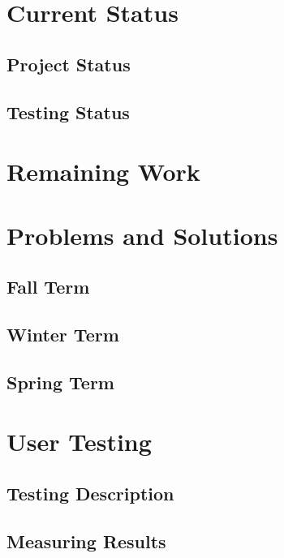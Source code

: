 \documentclass[letterpaper,10pt,titlepage,draftclsnofoot,onecolumn,onesided] {IEEEtran}
\begin{document}
\section{Current Status}
	\subsection{Project Status}
	
	\subsection{Testing Status}

\section{Remaining Work}


\section{Problems and Solutions}
	\subsection{Fall Term}
	
	
	\subsection{Winter Term}
	
	
	\subsection{Spring Term}

\section{User Testing}
	\subsection{Testing Description}
	
	\subsection{Measuring Results}

\pagebreak	
\end{document}
